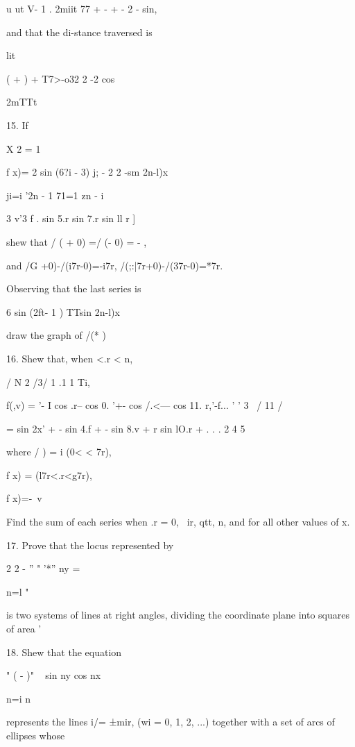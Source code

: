 u ut V- 1 . 2miit 77 + - + - 2 - sin,

and that the di-stance traversed is

lit

( + ) + T7>-o32 2 -2 cos

2mTTt


%
%

15. If

X 2 = 1

f x)= 2 sin (6?i - 3) j; - 2 2 -sm 2n-l)x

ji=i '2n - 1 71=1 zn - i

3 v'3 f . sin 5.r sin 7.r sin ll r ]

shew that / ( + 0) =/ (\pi - 0) = - \pi,

and /G +0)-/(i7r-0)=-i7r, /(;:|7r+0)-/(37r-0)=*7r.

Observing that the last series is

6 sin (2ft- 1 ) TTsin 2n-l)x

draw the graph of /(* ) 

16. Shew that, when <.r < n,

 / N 2 /3/ 1 .1 1 Ti, \

f(,v) = '- I cos .r-- cos 0. '+- cos /.<--- cos 11. r,'-f... ' ' 3 \
/ 11 /

= sin 2x' + - sin 4.f + - sin 8.v + r sin lO.r + . . . 2 4 5

where / ) = i (0< < 7r),

f x) = (l7r<.r<g7r),

f x)=-\ v %

Find the sum of each series when .r = 0, \ ir, qtt, n, and for all
other values of x.


17. Prove that the locus represented by

2 2 - '' " '*'' ny =

n=l "

is two systems of lines at right angles, dividing the coordinate plane
into squares of area \pi'\ \addexamplecitation{Math. Trip. 1895.}

18. Shew that the equation

" ( - )" ~ sin ny cos nx \

n=i n ~

represents the lines i/= ±mir, (wi = 0, 1, 2, ...) together with a set
of arcs of ellipses whose

